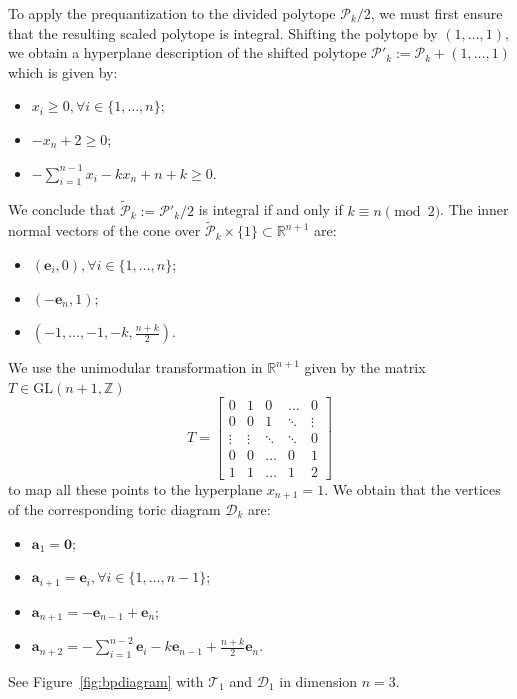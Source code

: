 \documentclass[a4paper,11pt,reqno]{amsart}
\newcommand{\R}{\mathbb R}
\newcommand{\Dd}{{\mathcal D}}
\newcommand{\Tt}{{\mathcal T}}
\newcommand{\Pp}{{\mathcal P}}
\begin{document}
To apply the prequantization to the divided polytope $\mathcal{P}_k / 2$, we must first ensure that the resulting 
scaled polytope is integral. Shifting the polytope by $(1,\dots,1)$, we obtain a hyperplane description of the 
shifted polytope $\mathcal{P}'_k := \mathcal{P}_k + (1,\dots,1)$ which is given by:
\begin{itemize}
\item $x_i \geq 0, \forall i \in \{1, \dots, n\}$;
\item $ -x_n + 2\geq 0$;
\item $-\sum_{i=1}^{n-1} x_i - k x_n +n+k \geq 0$.
\end{itemize}
We conclude that $\tilde\Pp_k := \mathcal{P}'_k / 2$ is integral if and only if $k \equiv n \pmod 2$. The inner normal 
vectors of the cone over $\tilde\Pp_k \times \{1\}\subset\R^{n+1}$ are:
\begin{itemize}
\item $(\bm{e}_i, 0), \forall i \in \{1, \dots, n\}$;
\item $(-\bm{e}_n, 1)$;
\item $(-1, \dots, -1, -k, \frac{n+k}{2})$.
\end{itemize}
We use the unimodular transformation in $\mathbb{R}^{n+1}$ given by the matrix $T \in \text{GL}(n+1, \mathbb{Z})$
\[
T = \begin{bmatrix}
		0 & 1 & 0 & \dots  & 0 \\
		0 & 0 & 1 & \ddots  & \vdots \\
		\vdots & \vdots & \ddots & \ddots & 0 \\
		0 & 0 & \dots & 0 & 1 \\
		1 & 1 & \dots & 1  & 2
\end{bmatrix}
\]
to map all these points to the hyperplane $x_{n+1}=1$. We obtain that the vertices of the corresponding toric diagram 
$\mathcal{D}_k$ are:
\begin{itemize}
\item $\bm{a}_1 = \bm{0}$;
\item $\bm{a}_{i+1} = \bm{e}_i, \forall i \in \{1, \dots, n-1\}$;
\item $\bm{a}_{n+1} = - \bm{e}_{n-1} + \bm{e}_n$;
\item $\bm{a}_{n+2} = - \sum_{i=1}^{n-2} \bm{e}_i - k \bm{e}_{n-1} + \frac{n+k}{2} \bm{e}_n$.
\end{itemize}
See Figure~\ref{fig:bpdiagram} with $\Tt_1$ and $\Dd_1$ in dimension $n=3$.
\end{document}
